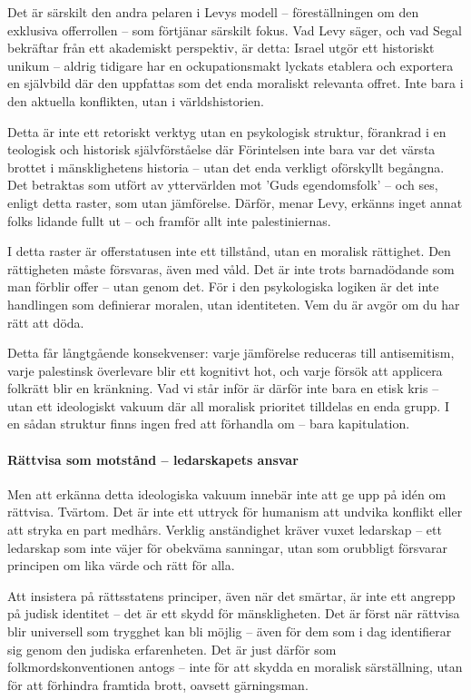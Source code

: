 \documentclass[12pt]{article}
\begin{document}
Det är särskilt den andra pelaren i Levys modell – föreställningen om den exklusiva offerrollen – som förtjänar särskilt fokus. Vad Levy säger, och vad Segal bekräftar från ett akademiskt perspektiv, är detta: Israel utgör ett historiskt unikum – aldrig tidigare har en ockupationsmakt lyckats etablera och exportera en självbild där den uppfattas som det enda moraliskt relevanta offret. Inte bara i den aktuella konflikten, utan i världshistorien.

Detta är inte ett retoriskt verktyg utan en psykologisk struktur, förankrad i en teologisk och historisk självförståelse där Förintelsen inte bara var det värsta brottet i mänsklighetens historia – utan det enda verkligt oförskyllt begångna. Det betraktas som utfört av yttervärlden mot 'Guds egendomsfolk' – och ses, enligt detta raster, som utan jämförelse. Därför, menar Levy, erkänns inget annat folks lidande fullt ut – och framför allt inte palestiniernas.

I detta raster är offerstatusen inte ett tillstånd, utan en moralisk rättighet. Den rättigheten måste försvaras, även med våld. Det är inte trots barnadödande som man förblir offer – utan genom det. För i den psykologiska logiken är det inte handlingen som definierar moralen, utan identiteten. Vem du är avgör om du har rätt att döda.

Detta får långtgående konsekvenser: varje jämförelse reduceras till antisemitism, varje palestinsk överlevare blir ett kognitivt hot, och varje försök att applicera folkrätt blir en kränkning. Vad vi står inför är därför inte bara en etisk kris – utan ett ideologiskt vakuum där all moralisk prioritet tilldelas en enda grupp. I en sådan struktur finns ingen fred att förhandla om – bara kapitulation.

\medskip
\paragraph*{Rättvisa som motstånd – ledarskapets ansvar}

Men att erkänna detta ideologiska vakuum innebär inte att ge upp på idén om rättvisa. Tvärtom. Det är inte ett uttryck för humanism att undvika konflikt eller att stryka en part medhårs. Verklig anständighet kräver vuxet ledarskap – ett ledarskap som inte väjer för obekväma sanningar, utan som orubbligt försvarar principen om lika värde och rätt för alla.

Att insistera på rättsstatens principer, även när det smärtar, är inte ett angrepp på judisk identitet – det är ett skydd för mänskligheten. Det är först när rättvisa blir universell som trygghet kan bli möjlig – även för dem som i dag identifierar sig genom den judiska erfarenheten. Det är just därför som folkmordskonventionen antogs – inte för att skydda en moralisk särställning, utan för att förhindra framtida brott, oavsett gärningsman.
\end{document}
